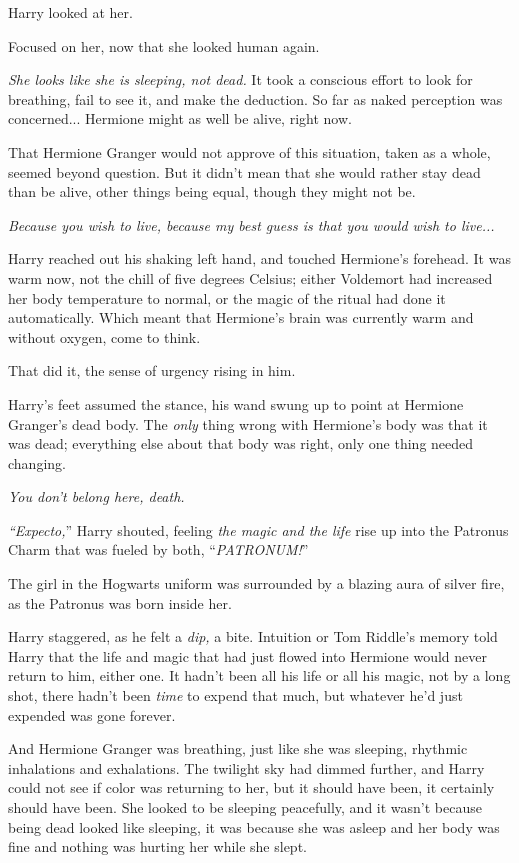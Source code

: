 Harry looked at her.

Focused on her, now that she looked human again.

\emph{She looks like she is sleeping, not dead.} It took a conscious effort to look for breathing, fail to see it, and make the deduction. So far as naked perception was concerned... Hermione might as well be alive, right now.

That Hermione Granger would not approve of this situation, taken as a whole, seemed beyond question. But it didn't mean that she would rather stay dead than be alive, other things being equal, though they might not be.

\emph{Because you wish to live, because my best guess is that you would wish to live...}

Harry reached out his shaking left hand, and touched Hermione's forehead. It was warm now, not the chill of five degrees Celsius; either Voldemort had increased her body temperature to normal, or the magic of the ritual had done it automatically. Which meant that Hermione's brain was currently warm and without oxygen, come to think.

That did it, the sense of urgency rising in him.

Harry's feet assumed the stance, his wand swung up to point at Hermione Granger's dead body. The \emph{only} thing wrong with Hermione's body was that it was dead; everything else about that body was right, only one thing needed changing.

\emph{You don't belong here, death.}

\emph{``Expecto,}'' Harry shouted, feeling \emph{the magic and the life} rise up into the Patronus Charm that was fueled by both, ``\emph{PATRONUM!}''

The girl in the Hogwarts uniform was surrounded by a blazing aura of silver fire, as the Patronus was born inside her.

Harry staggered, as he felt a \emph{dip,} a bite. Intuition or Tom Riddle's memory told Harry that the life and magic that had just flowed into Hermione would never return to him, either one. It hadn't been all his life or all his magic, not by a long shot, there hadn't been \emph{time} to expend that much, but whatever he'd just expended was gone forever.

And Hermione Granger was breathing, just like she was sleeping, rhythmic inhalations and exhalations. The twilight sky had dimmed further, and Harry could not see if color was returning to her, but it should have been, it certainly should have been. She looked to be sleeping peacefully, and it wasn't because being dead looked like sleeping, it was because she was asleep and her body was fine and nothing was hurting her while she slept.


